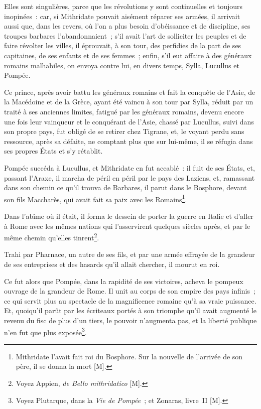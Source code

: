 \documentclass[french,twoside]{book} %
\newcommand\chapterclose{} %
\begin{document}
Elles sont singulières, parce que les révolutions y sont continuelles et toujours inopinées : car, si Mithridate pouvait aisément réparer ses armées, il arrivait aussi que, dans les revers, où l’on a plus besoin d’obéissance et de discipline, ses troupes barbares l’abandonnaient ; s’il avait l’art de solliciter les peuples et de faire révolter les villes, il éprouvait, à son tour, des perfidies de la part de ses capitaines, de ses enfants et de ses femmes ; enfin, s’il eut affaire à des généraux romains malhabiles, on envoya contre lui, en divers temps, Sylla, Lucullus et Pompée.\par
Ce prince, après avoir battu les généraux romains et fait la conquête de l’Asie, de la Macédoine et de la Grèce, ayant été vaincu à son tour par Sylla, réduit par un traité à ses anciennes limites, fatigué par les généraux romains, devenu encore une fois leur vainqueur et le conquérant de l’Asie, chassé par Lucullus, suivi dans son propre pays, fut obligé de se retirer chez Tigrane, et, le voyant perdu sans ressource, après sa défaite, ne comptant plus que sur lui-même, il se réfugia dans ses propres États et s’y rétablit.\par
Pompée succéda à Lucullus, et Mithridate en fut accablé : il fuit de ses États, et, passant l’Araxe, il marcha de péril en péril par le pays des Laziens, et, ramassant dans son chemin ce qu’il trouva de Barbares, il parut dans le Bosphore, devant son fils Maccharès, qui avait fait sa paix avec les Romains\footnote{Mithridate l’avait fait roi du Bosphore. Sur la nouvelle de l’arrivée de son père, il se donna la mort [M].}.\par
Dans l’abîme où il était, il forma le dessein de porter la guerre en Italie et d’aller à Rome avec les mêmes nations qui l’asservirent quelques siècles après, et par le même chemin qu’elles tinrent\footnote{Voyez Appien, {\itshape de Bello mithridatico} [M].}.\par
Trahi par Pharnace, un autre de ses fils, et par une armée effrayée de la grandeur de ses entreprises et des hasards qu’il allait chercher, il mourut en roi.\par
Ce fut alors que Pompée, dans la rapidité de ses victoires, acheva le pompeux ouvrage de la grandeur de Rome. Il unit au corps de son empire des pays infinis ; ce qui servit plus au spectacle de la magnificence romaine qu’à sa vraie puissance. Et, quoiqu’il parût par les écriteaux portés à son triomphe qu’il avait augmenté le revenu du fisc de plus d’un tiers, le pouvoir n’augmenta pas, et la liberté publique n’en fut que plus exposée\footnote{Voyez Plutarque, dans la {\itshape Vie de Pompée} ; et Zonaras, livre II [M].}.
\chapterclose
\end{document}
